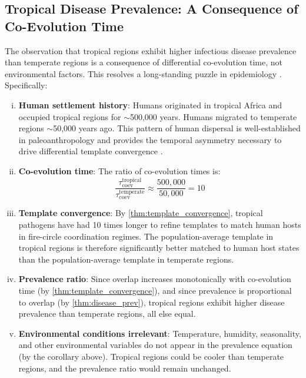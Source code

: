 \documentclass[11pt,twocolumn,a4paper]{article}
\begin{document}
\subsection{Tropical Disease Prevalence: A Consequence of Co-Evolution Time}

\begin{theorem}
\label{thm:tropical}
The observation that tropical regions exhibit higher infectious disease prevalence than temperate regions is a consequence of differential co-evolution time, not environmental factors. This resolves a long-standing puzzle in epidemiology \cite{drew2004infectious}. Specifically:



\begin{enumerate}[(i)]
\item \textbf{Human settlement history}: Humans originated in tropical Africa and occupied tropical regions for $\sim$500,000 years. Humans migrated to temperate regions $\sim$50,000 years ago. This pattern of human dispersal is well-established in paleoanthropology and provides the temporal asymmetry necessary to drive differential template convergence \cite{wolfe2007origins}.

\item \textbf{Co-evolution time}: The ratio of co-evolution times is:
\begin{equation}
\frac{\tau_{\mathrm{coev}}^{\mathrm{tropical}}}{\tau_{\mathrm{coev}}^{\mathrm{temperate}}} \approx \frac{500{,}000}{50{,}000} = 10
\label{eq:coev_ratio}
\end{equation}

\item \textbf{Template convergence}: By \cref{thm:template_convergence}, tropical pathogens have had 10 times longer to refine templates to match human hosts in fire-circle coordination regimes. The population-average template in tropical regions is therefore significantly better matched to human host states than the population-average template in temperate regions.

\item \textbf{Prevalence ratio}: Since overlap increases monotonically with co-evolution time (by \cref{thm:template_convergence}), and since prevalence is proportional to overlap (by \cref{thm:disease_prev}), tropical regions exhibit higher disease prevalence than temperate regions, all else equal.

\item \textbf{Environmental conditions irrelevant}: Temperature, humidity, seasonality, and other environmental variables do not appear in the prevalence equation (by the corollary above). Tropical regions could be cooler than temperate regions, and the prevalence ratio would remain unchanged.
\end{enumerate}
\end{theorem}
\end{document}
